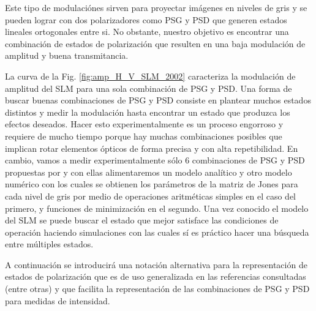 Este tipo de modulaciónes
sirven para proyectar imágenes en niveles de gris y se pueden lograr
con dos polarizadores como PSG y PSD que generen estados lineales ortogonales
entre si.
No obstante, nuestro objetivo es encontrar una combinación de estados
de polarización que resulten en una baja modulación de amplitud y
buena transmitancia. 

La curva de la Fig. \ref{fig:amp_H_V_SLM_2002} caracteriza la modulación de amplitud del SLM para
una sola combinación de PSG y PSD. Una forma de buscar buenas
combinaciones de PSG y PSD consiste en plantear muchos estados
distintos y medir la modulación hasta encontrar un estado que produzca
los efectos deseados. Hacer esto experimentalmente es un proceso
engorroso y requiere de mucho tiempo porque hay muchas combinaciones
posibles que implican rotar elementos ópticos de forma precisa y con
alta repetibilidad. 
En cambio, vamos a medir experimentalmente sólo 6 combinaciones de PSG
y PSD propuestas por  y con
ellas alimentaremos un modelo analítico y otro modelo numérico con los
cuales se obtienen los parámetros de la matriz de 
Jones para cada nivel de gris por medio de operaciones aritméticas
simples en el caso del primero, y funciones de minimización en el segundo.
Una vez conocido el modelo del SLM se puede buscar el
estado que mejor satisface las condiciones de operación haciendo simulaciones con
las cuales sí es práctico hacer una búsqueda entre múltiples estados.

A continuación se introducirá una notación alternativa para la
representación de estados de polarización que es de uso generalizada
en las referencias consultadas  (entre
otras) y que facilita la
representación de las combinaciones de PSG y PSD para medidas de
intensidad.  

